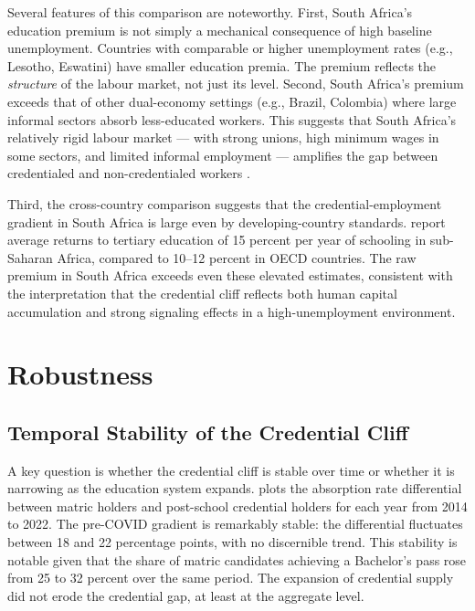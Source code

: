 \documentclass[12pt]{article}
\begin{document}
Several features of this comparison are noteworthy. First, South Africa's education premium is not simply a mechanical consequence of high baseline unemployment. Countries with comparable or higher unemployment rates (e.g., Lesotho, Eswatini) have smaller education premia. The premium reflects the \emph{structure} of the labour market, not just its level. Second, South Africa's premium exceeds that of other dual-economy settings (e.g., Brazil, Colombia) where large informal sectors absorb less-educated workers. This suggests that South Africa's relatively rigid labour market --- with strong unions, high minimum wages in some sectors, and limited informal employment --- amplifies the gap between credentialed and non-credentialed workers \citep{banerjee2008workplace}.

Third, the cross-country comparison suggests that the credential-employment gradient in South Africa is large even by developing-country standards. \citet{psacharopoulos2018returns} report average returns to tertiary education of 15 percent per year of schooling in sub-Saharan Africa, compared to 10--12 percent in OECD countries. The raw premium in South Africa exceeds even these elevated estimates, consistent with the interpretation that the credential cliff reflects both human capital accumulation and strong signaling effects in a high-unemployment environment.


\section{Robustness}
\label{sec:robustness}

\subsection{Temporal Stability of the Credential Cliff}

A key question is whether the credential cliff is stable over time or whether it is narrowing as the education system expands.  plots the absorption rate differential between matric holders and post-school credential holders for each year from 2014 to 2022. The pre-COVID gradient is remarkably stable: the differential fluctuates between 18 and 22 percentage points, with no discernible trend. This stability is notable given that the share of matric candidates achieving a Bachelor's pass rose from 25 to 32 percent over the same period. The expansion of credential supply did not erode the credential gap, at least at the aggregate level.
\end{document}
